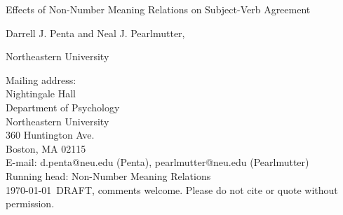 \documentclass[12pt,titlepage]{article}
\begin{document}

\begin{titlepage}
\thispagestyle{myheadings}  %
\begin{center}

\vspace*{\fill}  %

{\Large Effects of Non-Number Meaning Relations on Subject-Verb Agreement}

\vfill

{\large Darrell J. Penta and Neal J. Pearlmutter,

Northeastern University

\vfill

}
\end{center}

\vfill

\begin{flushleft}

Mailing address: \\
Nightingale Hall\\
Department of Psychology\\
Northeastern University\\
360 Huntington Ave.\\
Boston, MA 02115 \\[\baselineskip]

E-mail: d.penta@neu.edu (Penta), pearlmutter@neu.edu (Pearlmutter) \\[\baselineskip]

Running head: Non-Number Meaning Relations
\\[\baselineskip]

\today\ DRAFT, comments welcome.
Please do not cite or quote without permission.
\end{flushleft}

\end{titlepage}
\end{document}
